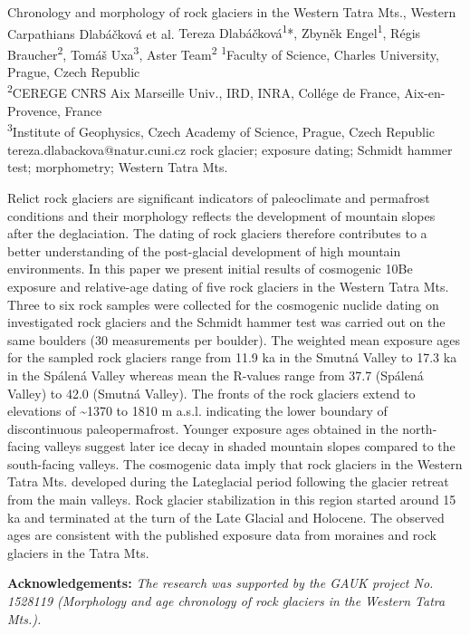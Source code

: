 
\abstract
{Chronology and morphology of rock glaciers in the Western Tatra Mts., Western Carpathians} 
{Dlabáčková et al.} 
{Tereza Dlabáčková\textsuperscript{1}*, Zbyněk Engel\textsuperscript{1}, Régis Braucher\textsuperscript{2}, Tomáš Uxa\textsuperscript{3}, Aster Team\textsuperscript{2}} 
{\POtag} 
{
\textsuperscript{1}Faculty of Science, Charles University, Prague, Czech Republic \\
\textsuperscript{2}CEREGE CNRS Aix Marseille Univ., IRD, INRA, Collége de France, Aix-en-Provence, France\\
\textsuperscript{3}Institute of Geophysics, Czech Academy of Science, Prague, Czech Republic
}
{tereza.dlabackova@natur.cuni.cz}  %
{rock glacier; exposure dating; Schmidt hammer test; morphometry; Western Tatra Mts.}
{Relict rock glaciers are significant indicators of paleoclimate and permafrost conditions and their morphology reflects the development of mountain slopes after the deglaciation. The dating of rock glaciers therefore contributes to a better understanding of the post-glacial development of high mountain environments. In this paper we present initial results of cosmogenic 10Be exposure and relative-age dating of five rock glaciers in the Western Tatra Mts. Three to six rock samples were collected for the cosmogenic nuclide dating on investigated rock glaciers and the Schmidt hammer test was carried out on the same boulders (30 measurements per boulder). The weighted mean exposure ages for the sampled rock glaciers range from 11.9 ka in the Smutná Valley to 17.3 ka in the Spálená Valley whereas mean the R-values range from 37.7 (Spálená Valley) to 42.0 (Smutná Valley). The fronts of the rock glaciers extend to elevations of \textasciitilde1370 to 1810 m a.s.l. indicating the lower boundary of discontinuous paleopermafrost. Younger exposure ages obtained in the north-facing valleys suggest later ice decay in shaded mountain slopes compared to the south-facing valleys. The cosmogenic data imply that rock glaciers in the Western Tatra Mts. developed during the Lateglacial period following the glacier retreat from the main valleys.  Rock glacier stabilization in this region started around 15 ka and terminated at the turn of the Late Glacial and Holocene. The observed ages are consistent with the published exposure data from moraines and rock glaciers in the Tatra Mts.

\vspace{0.5em}
\noindent
\textbf{Acknowledgements:}
\textit{The research was supported by the GAUK project No. 1528119 (Morphology and age chronology of rock glaciers in the Western Tatra Mts.).}
	
}
{
}

